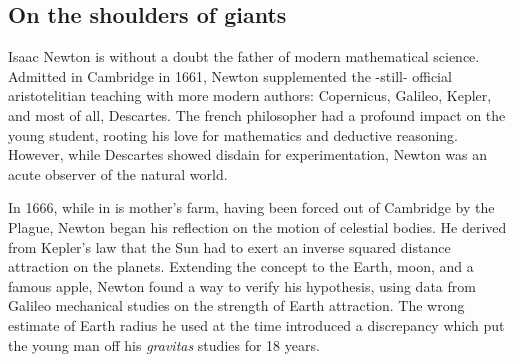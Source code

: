 \subsection*{On the shoulders of giants}

Isaac Newton is without a doubt the father of modern mathematical science. Admitted in Cambridge in 1661, Newton supplemented the -still- official aristotelitian teaching with more modern authors: Copernicus, Galileo, Kepler, and most of all, Descartes. The french philosopher had a profound impact on the young student, rooting his love for mathematics and deductive reasoning. However, while Descartes showed disdain for experimentation, Newton was an acute observer of the natural world. 

In 1666, while in is mother's farm, having been forced out of Cambridge by the Plague, Newton began his reflection on the motion of celestial bodies. He derived from Kepler's law that the Sun had to exert an inverse squared distance attraction on the planets. Extending the concept to the Earth, moon, and a famous apple, Newton found a way to verify his hypothesis, using data from Galileo mechanical studies on the strength of Earth attraction. The wrong estimate of Earth radius he used at the time introduced a discrepancy which put the young man off his \textit{gravitas} studies for 18 years.


